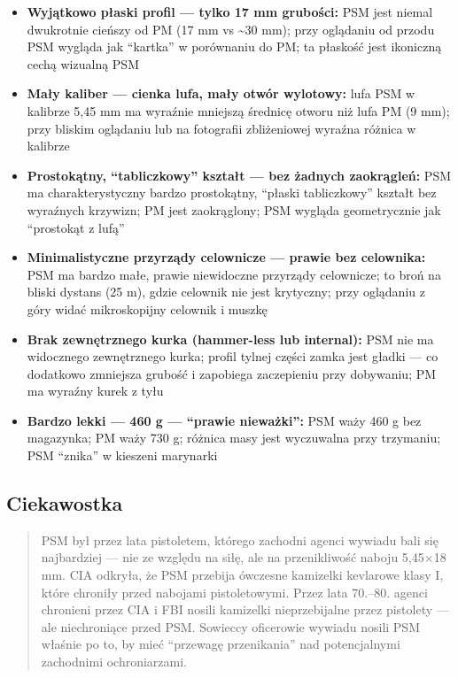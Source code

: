 \documentclass[12pt,oneside]{book}
\providecommand{\tightlist}{%
  \setlength{\itemsep}{0pt}\setlength{\parskip}{0pt}}
\begin{document}
\begin{itemize}
\tightlist
\item
  \textbf{Wyjątkowo płaski profil --- tylko 17 mm grubości:} PSM jest
  niemal dwukrotnie cieńszy od PM (17 mm vs \textasciitilde30 mm); przy
  oglądaniu od przodu PSM wygląda jak ``kartka'' w porównaniu do PM; ta
  płaskość jest ikoniczną cechą wizualną PSM
\item
  \textbf{Mały kaliber --- cienka lufa, mały otwór wylotowy:} lufa PSM w
  kalibrze 5,45 mm ma wyraźnie mniejszą średnicę otworu niż lufa PM (9
  mm); przy bliskim oglądaniu lub na fotografii zbliżeniowej wyraźna
  różnica w kalibrze
\item
  \textbf{Prostokątny, ``tabliczkowy'' kształt --- bez żadnych
  zaokrągleń:} PSM ma charakterystyczny bardzo prostokątny, ``płaski
  tabliczkowy'' kształt bez wyraźnych krzywizn; PM jest zaokrąglony; PSM
  wygląda geometrycznie jak ``prostokąt z lufą''
\item
  \textbf{Minimalistyczne przyrządy celownicze --- prawie bez
  celownika:} PSM ma bardzo małe, prawie niewidoczne przyrządy
  celownicze; to broń na bliski dystans (25 m), gdzie celownik nie jest
  krytyczny; przy oglądaniu z góry widać mikroskopijny celownik i muszkę
\item
  \textbf{Brak zewnętrznego kurka (hammer-less lub internal):} PSM nie
  ma widocznego zewnętrznego kurka; profil tylnej części zamka jest
  gładki --- co dodatkowo zmniejsza grubość i zapobiega zaczepieniu przy
  dobywaniu; PM ma wyraźny kurek z tyłu
\item
  \textbf{Bardzo lekki --- 460 g --- ``prawie nieważki'':} PSM waży 460
  g bez magazynka; PM waży 730 g; różnica masy jest wyczuwalna przy
  trzymaniu; PSM ``znika'' w kieszeni marynarki
\end{itemize}

\subsection{Ciekawostka}\label{ciekawostka-105}

\begin{quote}
PSM był przez lata pistoletem, którego zachodni agenci wywiadu bali się
najbardziej --- nie ze względu na siłę, ale na przenikliwość naboju
5,45×18 mm. CIA odkryła, że PSM przebija ówczesne kamizelki kevlarowe
klasy I, które chroniły przed nabojami pistoletowymi. Przez lata
70.--80. agenci chronieni przez CIA i FBI nosili kamizelki
nieprzebijalne przez pistolety --- ale niechroniące przed PSM. Sowieccy
oficerowie wywiadu nosili PSM właśnie po to, by mieć ``przewagę
przenikania'' nad potencjalnymi zachodnimi ochroniarzami.
\end{quote}
\end{document}

